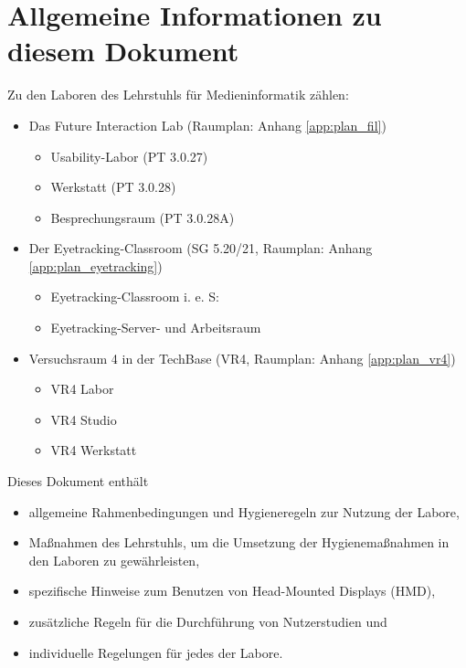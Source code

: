 \section{Allgemeine Informationen zu diesem Dokument}\label{sec:infos}

{
\singlespacing

Zu den Laboren des Lehrstuhls für Medieninformatik zählen:

\begin{itemize}
    \item Das Future Interaction Lab (Raumplan: Anhang \ref{app:plan_fil})
    \begin{itemize}
        \item Usability-Labor (PT 3.0.27)
        \item Werkstatt (PT 3.0.28)
        \item Besprechungsraum (PT 3.0.28A)
    \end{itemize}
    \item Der Eyetracking-Classroom (SG 5.20/21, Raumplan: Anhang \ref{app:plan_eyetracking})
    \begin{itemize}
        \item Eyetracking-Classroom i. e. S:
        \item Eyetracking-Server- und Arbeitsraum
    \end{itemize}
    \item Versuchsraum 4 in der TechBase (VR4, Raumplan: Anhang \ref{app:plan_vr4})
    \begin{itemize}
        \item VR4 Labor
        \item VR4 Studio
        \item VR4 Werkstatt
    \end{itemize}
\end{itemize}

\bigskip
\noindent
Dieses Dokument enthält

\begin{itemize}
    \item allgemeine Rahmenbedingungen und Hygieneregeln zur Nutzung der Labore,
    \item Maßnahmen des Lehrstuhls, um die Umsetzung der Hygienemaßnahmen in den Laboren zu gewährleisten,
    \item spezifische Hinweise zum Benutzen von Head-Mounted Displays (HMD),
    \item zusätzliche Regeln für die Durchführung von Nutzerstudien und
    \item individuelle Regelungen für jedes der Labore.
\end{itemize}

}
